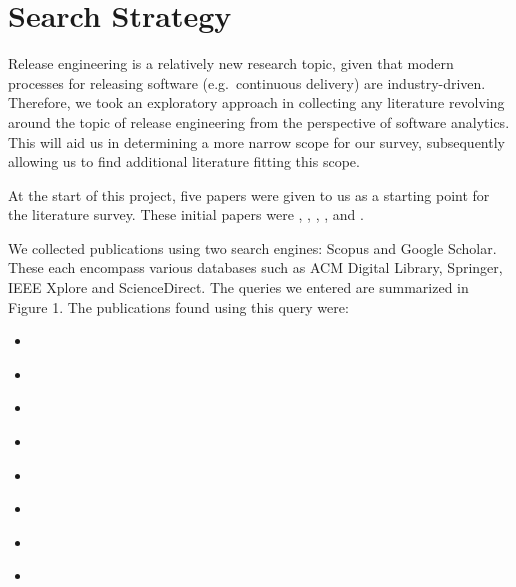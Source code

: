 \documentclass[]{book}
\providecommand{\tightlist}{%
  \setlength{\itemsep}{0pt}\setlength{\parskip}{0pt}}
\begin{document}
\section{Search Strategy}\label{search-strategy-1}

Release engineering is a relatively new research topic, given that
modern processes for releasing software (e.g.~continuous delivery) are
industry-driven. Therefore, we took an exploratory approach in
collecting any literature revolving around the topic of release
engineering from the perspective of software analytics. This will aid us
in determining a more narrow scope for our survey, subsequently allowing
us to find additional literature fitting this scope.

At the start of this project, five papers were given to us as a starting
point for the literature survey. These initial papers were
\citet{adams2016a}, \citet{da2016a}, \citet{d2014a}, \citet{khomh2012a},
and \citet{khomh2015a}.

We collected publications using two search engines: Scopus and Google
Scholar. These each encompass various databases such as ACM Digital
Library, Springer, IEEE Xplore and ScienceDirect. The queries we entered
are summarized in Figure 1. The publications found using this query
were:

\begin{itemize}
\tightlist
\item
  \citet{kaur2019a}
\item
  \citet{kerzazi2013a}
\item
  \citet{castelluccio2017a}
\item
  \citet{karvonen2017a}
\item
  \citet{claes2017a}
\item
  \citet{fujibayashi2017a}
\item
  \citet{souza2015a}
\item
  \citet{laukkanen2018a}
\end{itemize}
\end{document}
